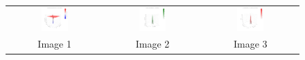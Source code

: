 \documentclass{article}
\begin{document}
\begin{figure}[h]
\centering
\begin{tabular}{ccc}
\includegraphics[width=0.3\textwidth]{inst/figures/img_3Dm_1.png} &
\includegraphics[width=0.3\textwidth]{inst/figures/img_3Dm_2.png} &
\includegraphics[width=0.3\textwidth]{inst/figures/img_3Dm_3.png} \\
Image 1 & Image 2 & Image 3 \\
\end{tabular}
\end{figure}
\end{document}
